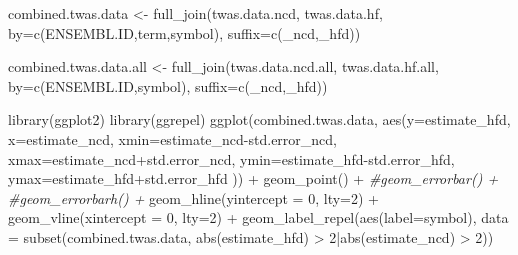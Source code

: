 \documentclass[
]{article}
\newenvironment{Shaded}{\begin{snugshade}}{\end{snugshade}}
\newcommand{\AttributeTok}[1]{\textcolor[rgb]{0.77,0.63,0.00}{#1}}
\newcommand{\CommentTok}[1]{\textcolor[rgb]{0.56,0.35,0.01}{\textit{#1}}}
\newcommand{\DecValTok}[1]{\textcolor[rgb]{0.00,0.00,0.81}{#1}}
\newcommand{\FunctionTok}[1]{\textcolor[rgb]{0.00,0.00,0.00}{#1}}
\newcommand{\NormalTok}[1]{#1}
\newcommand{\OtherTok}[1]{\textcolor[rgb]{0.56,0.35,0.01}{#1}}
\newcommand{\SpecialCharTok}[1]{\textcolor[rgb]{0.00,0.00,0.00}{#1}}
\newcommand{\StringTok}[1]{\textcolor[rgb]{0.31,0.60,0.02}{#1}}
\begin{document}
\begin{Shaded}
\begin{Highlighting}[]
\NormalTok{combined.twas.data }\OtherTok{\textless{}{-}}
  \FunctionTok{full\_join}\NormalTok{(twas.data.ncd, twas.data.hf, }\AttributeTok{by=}\FunctionTok{c}\NormalTok{(}\StringTok{\textquotesingle{}ENSEMBL.ID\textquotesingle{}}\NormalTok{,}\StringTok{\textquotesingle{}term\textquotesingle{}}\NormalTok{,}\StringTok{\textquotesingle{}symbol\textquotesingle{}}\NormalTok{), }\AttributeTok{suffix=}\FunctionTok{c}\NormalTok{(}\StringTok{\textquotesingle{}\_ncd\textquotesingle{}}\NormalTok{,}\StringTok{\textquotesingle{}\_hfd\textquotesingle{}}\NormalTok{))}

\NormalTok{combined.twas.data.all }\OtherTok{\textless{}{-}}
  \FunctionTok{full\_join}\NormalTok{(twas.data.ncd.all, twas.data.hf.all, }\AttributeTok{by=}\FunctionTok{c}\NormalTok{(}\StringTok{\textquotesingle{}ENSEMBL.ID\textquotesingle{}}\NormalTok{,}\StringTok{\textquotesingle{}symbol\textquotesingle{}}\NormalTok{), }\AttributeTok{suffix=}\FunctionTok{c}\NormalTok{(}\StringTok{\textquotesingle{}\_ncd\textquotesingle{}}\NormalTok{,}\StringTok{\textquotesingle{}\_hfd\textquotesingle{}}\NormalTok{))}

\FunctionTok{library}\NormalTok{(ggplot2)}
\FunctionTok{library}\NormalTok{(ggrepel)}
\FunctionTok{ggplot}\NormalTok{(combined.twas.data, }
       \FunctionTok{aes}\NormalTok{(}\AttributeTok{y=}\NormalTok{estimate\_hfd, }\AttributeTok{x=}\NormalTok{estimate\_ncd,}
           \AttributeTok{xmin=}\NormalTok{estimate\_ncd}\SpecialCharTok{{-}}\NormalTok{std.error\_ncd, }\AttributeTok{xmax=}\NormalTok{estimate\_ncd}\SpecialCharTok{+}\NormalTok{std.error\_ncd,}
           \AttributeTok{ymin=}\NormalTok{estimate\_hfd}\SpecialCharTok{{-}}\NormalTok{std.error\_hfd, }\AttributeTok{ymax=}\NormalTok{estimate\_hfd}\SpecialCharTok{+}\NormalTok{std.error\_hfd )) }\SpecialCharTok{+}
  \FunctionTok{geom\_point}\NormalTok{() }\SpecialCharTok{+}
  \CommentTok{\#geom\_errorbar() +}
  \CommentTok{\#geom\_errorbarh() +}
  \FunctionTok{geom\_hline}\NormalTok{(}\AttributeTok{yintercept =} \DecValTok{0}\NormalTok{, }\AttributeTok{lty=}\DecValTok{2}\NormalTok{) }\SpecialCharTok{+}
  \FunctionTok{geom\_vline}\NormalTok{(}\AttributeTok{xintercept =} \DecValTok{0}\NormalTok{, }\AttributeTok{lty=}\DecValTok{2}\NormalTok{) }\SpecialCharTok{+}
  \FunctionTok{geom\_label\_repel}\NormalTok{(}\FunctionTok{aes}\NormalTok{(}\AttributeTok{label=}\NormalTok{symbol),}
                   \AttributeTok{data =} \FunctionTok{subset}\NormalTok{(combined.twas.data, }\FunctionTok{abs}\NormalTok{(estimate\_hfd) }\SpecialCharTok{\textgreater{}} \DecValTok{2}\SpecialCharTok{|}\FunctionTok{abs}\NormalTok{(estimate\_ncd) }\SpecialCharTok{\textgreater{}} \DecValTok{2}\NormalTok{))}
\end{Highlighting}
\end{Shaded}
\end{document}
